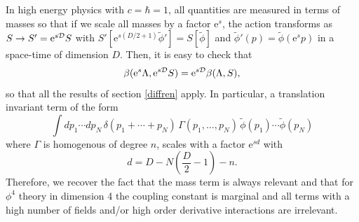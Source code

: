 \documentclass[10pt,here,feynmf]{article}
\begin{document}
In high energy physics with $c=\hbar=1$, all quantities are measured in terms of masses so that if we scale all masses by a factor $\mathrm{e}^{s}$, the action transforms as $S\rightarrow S'=\mathrm{e}^{s{\cal D}} S$ with $S'[\mathrm{e}^{s(D/2+1)}\widetilde{\phi}']=S[\widetilde{\phi}]$ and $\widetilde{\phi}'(p)=\widetilde{\phi}(\mathrm{e}^{s}p)$ in a space-time of dimension $D$. Then, it is easy to check that 
\begin{equation}
\beta(\mathrm{e}^{s}\Lambda,\mathrm{e}^{s{\cal D}} S)=\mathrm{e}^{s{\cal D}}\beta(\Lambda,S),
\end{equation}
 so that all the results of section \ref{diffren} apply. In particular, a translation invariant term of the form
\begin{equation}
\int dp_{1}\cdots dp_{N}\,\delta(p_{1}+\cdots+p_{N})\,\Gamma(p_{1},\dots,p_{N})\,
\widetilde{\phi}(p_{1})\cdots\widetilde{\phi}(p_{N})
\end{equation}
where $\Gamma$ is homogenous of degree $n$, scales with a factor $\mathrm{e}^{sd }$ with
\begin{equation}
d=D-N\left(\frac{D}{2}-1\right)-n.
\end{equation}
Therefore, we recover the fact that the mass term is always relevant and that for $\phi^{4}$ theory in dimension 4 the coupling constant is marginal and all terms with a high number of fields and/or high order derivative interactions are irrelevant.
\end{document}
